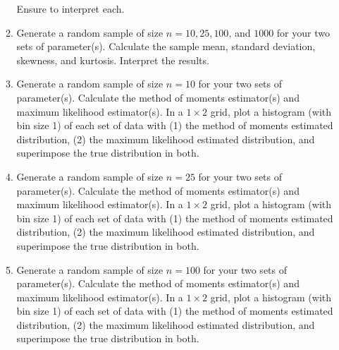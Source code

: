 \documentclass{article}\usepackage[]{graphicx}\usepackage[]{color}
\begin{document}
\begin{enumerate}
\begin{enumerate}
  Ensure to interpret each.
  \item Generate a random sample of size $n=10, 25, 100$, and $1000$ for your 
  two sets of parameter(s). Calculate the sample mean, standard deviation, 
  skewness, and kurtosis. Interpret the results.
  \item Generate a random sample of size $n=10$ for your two sets of parameter(s).
  Calculate the method of moments estimator(s) and maximum likelihood estimator(s).
  In a $1 \times 2$ grid, plot a histogram (with bin size 1) of each set of data 
  with (1) the method of moments estimated distribution, (2) the maximum likelihood 
  estimated distribution, and superimpose the true distribution in both.
  \item Generate a random sample of size $n=25$ for your two sets of parameter(s). 
  Calculate the method of moments estimator(s) and maximum likelihood estimator(s).
  In a $1 \times 2$ grid, plot a histogram (with bin size 1) of each set of data 
  with (1) the method of moments estimated distribution, (2) the maximum likelihood 
  estimated distribution, and superimpose the true distribution in both.
  \item Generate a random sample of size $n=100$ for your two sets of parameter(s).
  Calculate the method of moments estimator(s) and maximum likelihood estimator(s). 
  In a $1 \times 2$ grid, plot a histogram (with bin size 1) of each set of data 
  with (1) the method of moments estimated distribution, (2) the maximum likelihood
  estimated distribution, and superimpose the true distribution in both.

\end{enumerate}
\end{enumerate}
\end{document}
